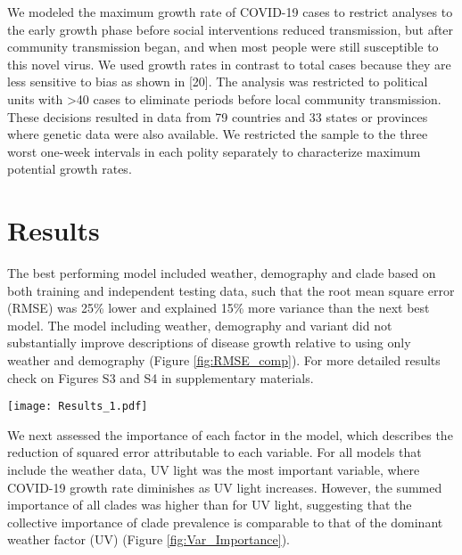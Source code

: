 \documentclass[9pt,twocolumn,twoside,lineno]{pnas-new}
\begin{document}
We modeled the maximum growth rate of COVID-19 cases to restrict analyses to the early growth phase before social interventions reduced transmission, but after community transmission began, and when most people were still susceptible to this novel virus. We used growth rates in contrast to total cases because they are less sensitive to bias as shown in [20]. The analysis was restricted to political units with >40 cases to eliminate periods before local community transmission. These decisions resulted in data from 79 countries and 33 states or provinces where genetic data were also available. We restricted the sample to the three worst one-week intervals in each polity separately to characterize maximum potential growth rates.

\section*{Results}

The best performing model included weather, demography and clade based on both training and independent testing data, such that the root mean square error (RMSE) was 25\% lower and explained 15\% more variance than the next best model. The model including weather, demography and variant did not substantially improve descriptions of disease growth relative to using only weather and demography (Figure \ref{fig:RMSE_comp}). For more detailed results check on Figures S3 and S4 in supplementary materials.

\begin{SCfigure*}[\sidecaptionrelwidth][t]
\centering
\texttt{[image: Results\_1.pdf]}
\caption{Boxplot of the root mean square error (RMSE) of the models fitted for the train and test sets, where the notches in the boxplot represent the 95\% confidence interval of the median and dots indicate outliers. Smaller RMSE indicate better models. In both the training and test sets, the best performing model is the weather, demography and clade model. The variant, demography and weather model on the other hand does not improve on the weather-only model in the test set, which suggests that the variant is less informative than clade.}
\label{fig:RMSE_comp}
\end{SCfigure*}

We next assessed the importance of each factor in the model, which describes the reduction of squared error attributable to each variable. For all models that include the weather data, UV light was the most important variable, where COVID-19 growth rate diminishes as UV light increases. However, the summed importance of all clades was higher than for UV light, suggesting that the collective importance of clade prevalence is comparable to that of the dominant weather factor (UV) (Figure \ref{fig:Var_Importance}). 
\end{document}
